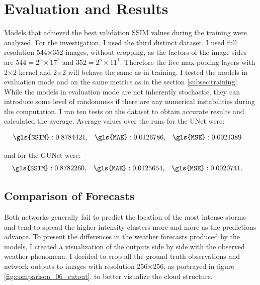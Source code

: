 \chapter{Evaluation and Results}
\label{chap:evaluation_results}

Models that achieved the best validation \gls{SSIM} values during the training were analyzed. For the investigation, I used the third distinct dataset. I used full resolution 544×352 images, without cropping, as the factors of the image sides are $544 = 2^5\times 17^1$ and $352 = 2^5\times 11^1$. Therefore the five max-pooling layers with 2×2 kernel and 2×2 will behave the same as in training. I tested the models in evaluation mode and on the same metrics as in the section \ref{subsec:training}. While the models in evaluation mode are not inherently stochastic, they can introduce some level of randomness if there are any numerical instabilities during the computation. I ran ten tests on the dataset to obtain accurate results and calculated the average. Average values over the runs for the UNet were:

\begin{align*}
    &\texttt{\gls{SSIM}}: 0.8784421, & &\texttt{\gls{MAE}}: 0.0126786, & &\texttt{\gls{MSE}}: 0.0021389
\end{align*}

\noindent and for the \gls{GUNet} were:
\begin{align*}
    &\texttt{\gls{SSIM}}: 0.8782260, & &\texttt{\gls{MAE}}: 0.0125654, & &\texttt{\gls{MSE}}:0.0020741.
\end{align*}

\section{Comparison of Forecasts}
\label{sec:comparison}

Both networks generally fail to predict the location of the most intense storms and tend to spread the higher-intensity clusters more and more as the predictions advance. To present the differences in the weather forecasts produced by the models, I created a visualization of the outputs side by side with the observed weather phenomena. I decided to crop all the ground truth observations and network outputs to images with resolution 256×256, as portrayed in figure \ref{fig:comparison_06_cutout}, to better visualize the cloud structure.


